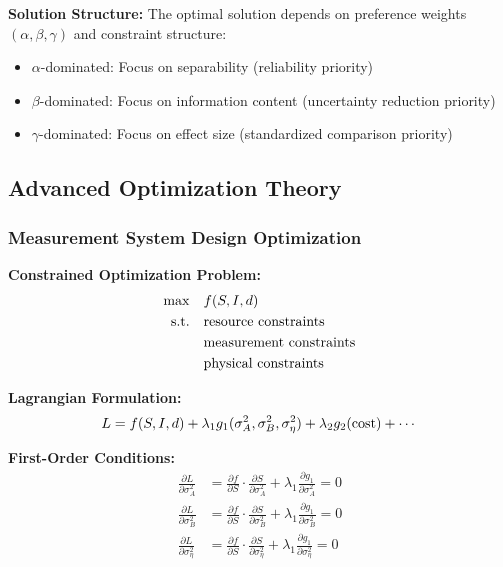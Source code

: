 \textbf{Solution Structure:}
The optimal solution depends on preference weights $(\alpha, \beta, \gamma)$ and constraint structure:
\begin{itemize}
\item $\alpha$-dominated: Focus on separability (reliability priority)
\item $\beta$-dominated: Focus on information content (uncertainty reduction priority)  
\item $\gamma$-dominated: Focus on effect size (standardized comparison priority)
\end{itemize}

\subsection{Advanced Optimization Theory}

\subsubsection{Measurement System Design Optimization}

\textbf{Constrained Optimization Problem:}
\begin{align}
\max \quad & f(S, I, d) \\
\text{s.t.} \quad & \text{resource constraints} \\
& \text{measurement constraints} \\
& \text{physical constraints}
\end{align}

\textbf{Lagrangian Formulation:}
\begin{equation}
L = f(S, I, d) + \lambda_1 g_1(\sigma_A^2, \sigma_B^2, \sigma_\eta^2) + \lambda_2 g_2(\text{cost}) + \cdots
\end{equation}

\textbf{First-Order Conditions:}
\begin{align}
\frac{\partial L}{\partial \sigma_A^2} &= \frac{\partial f}{\partial S} \cdot \frac{\partial S}{\partial \sigma_A^2} + \lambda_1 \frac{\partial g_1}{\partial \sigma_A^2} = 0 \\
\frac{\partial L}{\partial \sigma_B^2} &= \frac{\partial f}{\partial S} \cdot \frac{\partial S}{\partial \sigma_B^2} + \lambda_1 \frac{\partial g_1}{\partial \sigma_B^2} = 0 \\
\frac{\partial L}{\partial \sigma_\eta^2} &= \frac{\partial f}{\partial S} \cdot \frac{\partial S}{\partial \sigma_\eta^2} + \lambda_1 \frac{\partial g_1}{\partial \sigma_\eta^2} = 0
\end{align}

